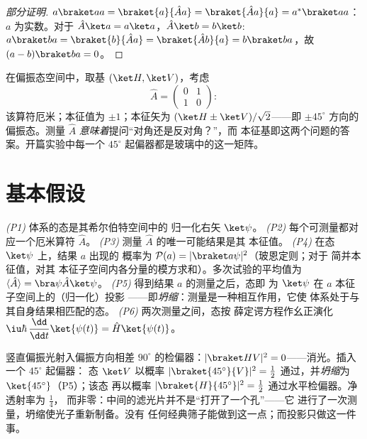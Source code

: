 \begin{proof}[部分证明]
$a\braket aa = \braket{a}{\hat Aa} = \braket{\hat Aa}{a} =
a^*\braket aa$：$a$ 为实数。对于 $\hat A\ket a = a\ket a$，$\hat A\ket b
= b\ket b$: $a\braket ba = \braket{b}{\hat Aa} = \braket{\hat
Ab}{a} = b\braket ba$，故 $(a - b)\braket ba = 0$。
\end{proof}

\begin{example}[两能级可观测量]\label{ex:b3:quantum-formalism:twolevel}
在偏振态空间中，取基 $(\ket H, \ket V)$，考虑
\[
\hat A = \begin{pmatrix} 0 & 1\\ 1 & 0\end{pmatrix} :
\]
该算符厄米；本征值为 $\pm1$；本征矢为 $(\ket H \pm
\ket V)/\sqrt2$——即 $\pm45^\circ$ 方向的偏振态。测量
$\hat A$ \emph{意味着}提问“对角还是反对角？”，而
本征基即这两个问题的答案。开篇实验中每一个 $45^\circ$
起偏器都是玻璃中的这一矩阵。
\end{example}

\section{基本假设}

\begin{theorem}[量子力学的规则]\label{thm:b3:quantum-formalism:postulates}
\emph{(P1)} 体系的态是其希尔伯特空间中的
归一化右矢 $\ket\psi$。
\emph{(P2)} 每个可测量都对应一个厄米算符
$\hat A$。
\emph{(P3)} 测量 $\hat A$ 的唯一可能结果是其
本征值。
\emph{(P4)} 在态 $\ket\psi$ 上，结果 $a$ 出现的
概率为 $\mathcal P(a) = |\braket a\psi|^2$（玻恩定则；对于
简并本征值，对其
本征子空间内各分量的模方求和）。多次试验的平均值为 $\langle\hat A\rangle =
\bra\psi\hat A\ket\psi$。
\emph{(P5)} 得到结果 $a$ 的测量之后，态即
为 $\ket\psi$ 在 $a$ 本征子空间上的（归一化）投影
——即\emph{坍缩}：测量是一种相互作用，它使
体系处于与其自身结果相匹配的态。
\emph{(P6)} 两次测量之间，态按
薛定谔方程作幺正演化
$\iu\hbar\,\dfrac{\dd}{\dd t}\ket{\psi(t)} = \hat H\ket{\psi(t)}$。
\end{theorem}
\admitted

\begin{example}[三个起偏器的计算]\label{ex:b3:quantum-formalism:threepolarizers}
竖直偏振光射入偏振方向相差 $90^\circ$ 的检偏器：$|\braket
HV|^2 = 0$——消光。插入一个 $45^\circ$ 起偏器：
态 $\ket V$ 以概率 $|\braket{45^\circ}{V}|^2 =
\tfrac12$ 通过，并\emph{坍缩}为 $\ket{45^\circ}$（P5）；该态
再以概率
$|\braket{H}{45^\circ}|^2 = \tfrac12$ 通过水平检偏器。净透射率为 $\tfrac14$，
而非零：中间的滤光片并不是“打开了一个孔”——它
进行了一次测量，坍缩使光子重新制备。没有
任何经典筛子能做到这一点；而投影只做这一件事。
\end{example}

